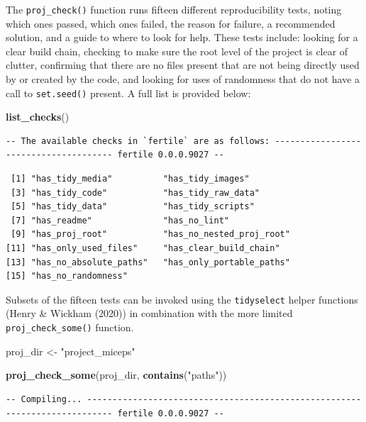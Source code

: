 \documentclass[12pt,twoside]{reedthesis}
\newenvironment{Shaded}{\begin{snugshade}}{\end{snugshade}}
\newcommand{\KeywordTok}[1]{\textcolor[rgb]{0.13,0.29,0.53}{\textbf{#1}}}
\newcommand{\StringTok}[1]{\textcolor[rgb]{0.31,0.60,0.02}{#1}}
\newcommand{\NormalTok}[1]{#1}
\begin{document}
The \texttt{proj\_check()} function runs fifteen different
reproducibility tests, noting which ones passed, which ones failed, the
reason for failure, a recommended solution, and a guide to where to look
for help. These tests include: looking for a clear build chain, checking
to make sure the root level of the project is clear of clutter,
confirming that there are no files present that are not being directly
used by or created by the code, and looking for uses of randomness that
do not have a call to \texttt{set.seed()} present. A full list is
provided below:
\begin{Shaded}
\begin{Highlighting}[]
\KeywordTok{list_checks}\NormalTok{()}
\end{Highlighting}
\end{Shaded}
\begin{verbatim}
-- The available checks in `fertile` are as follows: -------------------------------------- fertile 0.0.0.9027 --
\end{verbatim}
\begin{verbatim}
 [1] "has_tidy_media"          "has_tidy_images"        
 [3] "has_tidy_code"           "has_tidy_raw_data"      
 [5] "has_tidy_data"           "has_tidy_scripts"       
 [7] "has_readme"              "has_no_lint"            
 [9] "has_proj_root"           "has_no_nested_proj_root"
[11] "has_only_used_files"     "has_clear_build_chain"  
[13] "has_no_absolute_paths"   "has_only_portable_paths"
[15] "has_no_randomness"      
\end{verbatim}
Subsets of the fifteen tests can be invoked using the
\texttt{tidyselect} helper functions (Henry \& Wickham (2020)) in
combination with the more limited \texttt{proj\_check\_some()} function.
\begin{Shaded}
\begin{Highlighting}[]
\NormalTok{proj_dir <-}\StringTok{ "project_miceps"}
\end{Highlighting}
\end{Shaded}
\begin{Shaded}
\begin{Highlighting}[]
\KeywordTok{proj_check_some}\NormalTok{(proj_dir, }\KeywordTok{contains}\NormalTok{(}\StringTok{"paths"}\NormalTok{))}
\end{Highlighting}
\end{Shaded}
\begin{verbatim}
-- Compiling... --------------------------------------------------------------------------- fertile 0.0.0.9027 --
\end{verbatim}
\end{document}
